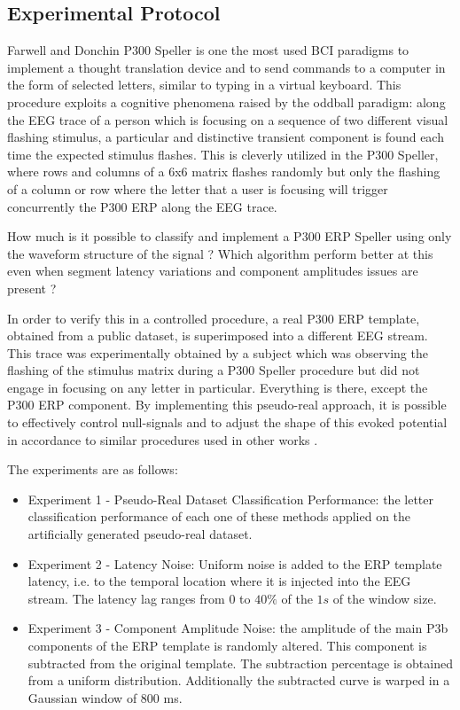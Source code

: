 \documentclass[brainsci,article,submit,moreauthors,pdftex,10pt,a4paper]{mdpi}
\begin{document}

\subsection{Experimental Protocol}
\label{Experimental}

Farwell and Donchin P300 Speller \citep{Farwell1988} is one the most used BCI paradigms to implement a thought translation device and to send commands to a computer in the form of selected letters, similar to typing in a virtual keyboard.  This procedure exploits a cognitive phenomena raised by the oddball paradigm: along the EEG trace of a person which is focusing on a sequence of two different visual flashing stimulus, a particular and distinctive transient component is found each time the expected stimulus flashes.  This is cleverly utilized in the P300 Speller, where rows and columns of a 6x6 matrix flashes randomly but only the flashing of a column or row where the letter that a user is focusing will trigger concurrently the P300 ERP along the EEG trace.

How much is it possible to classify and implement a P300 ERP Speller using only the waveform structure of the signal ? Which algorithm perform better at this even when segment latency variations and component amplitudes issues are present ?

In order to verify this in a controlled procedure, a real P300 ERP template, obtained from a public dataset, is superimposed into a different EEG stream.  This trace was experimentally obtained by a subject which was observing the flashing of the stimulus matrix during a P300 Speller procedure but did not engage in focusing on any letter in particular. Everything is there, except the P300 ERP component. By implementing this pseudo-real approach, it is possible to effectively control null-signals and to adjust the shape of this evoked potential in accordance to similar procedures used in other works \citep{Ouyang2017,Jaskowski2000,QuianQuiroga2003}.

The experiments are as follows:

\begin{itemize}
\item Experiment 1 - Pseudo-Real Dataset Classification Performance: the letter classification performance of each one of these methods applied on the artificially generated pseudo-real dataset.
\item Experiment 2 - Latency Noise: Uniform noise is added to the ERP template latency, i.e. to the temporal location where it is injected into the EEG stream.  The latency lag ranges from $0$ to $40\%$ of the $1s$ of the window size. 
\item Experiment 3 - Component Amplitude Noise: the amplitude of the main P3b components of the ERP template is randomly altered.  This component is subtracted from the original template.  The subtraction percentage is obtained from a uniform distribution.  Additionally the subtracted curve is warped in a Gaussian window of 800 ms.
\end{itemize}
\end{document}
